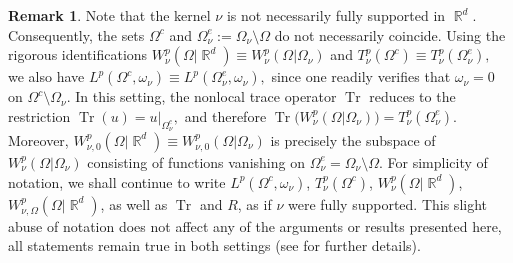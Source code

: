 \documentclass[12pt, reqno]{amsart}%
\theoremstyle{plain}  %
\theoremstyle{definition}  %
\newtheorem{remark}[theorem]{Remark}   %
\numberwithin{equation}{section}
\DeclareMathOperator{\R}{\mathbb{R}}
\newcommand{\WnuOmR}{W^{p}_{\nu}(\Omega|\R^d )}
\newcommand{\WnuOmO}{W^{p}_{\nu,\Omega}(\Omega|\R^d )}%
\newcommand{\WnuOmRO}{W_{\nu,0}^{p}(\Omega|\R^d )}%
\newcommand{\TnuOm}{T^{p}_{\nu} (\Omega^c)}
\begin{document}
\begin{remark}
Note that the kernel $\nu$ is not necessarily fully supported in $\R^d$. Consequently, the sets $\Omega^c$ and
$\Omega^e_\nu := \Omega_\nu \setminus \Omega$ do not necessarily coincide.
Using the rigorous identifications
$\WnuOmR \equiv W^p_{\nu}(\Omega | \Omega_\nu) $ and $\TnuOm \equiv T^p_{\nu}(\Omega^e_\nu),$
we also have $L^p(\Omega^c,\omega_\nu) \equiv L^p(\Omega^e_\nu,\omega_\nu),$
since one readily verifies that $\omega_\nu = 0$ on $\Omega^c \setminus \Omega_\nu$. In this setting, the nonlocal trace operator $\operatorname{Tr}$ reduces to the restriction $\operatorname{Tr}(u) = u\big|_{\Omega^e_\nu},$ and therefore $\operatorname{Tr}\big(W^p_\nu(\Omega | \Omega_\nu)\big) = T^p_{\nu}(\Omega^e_\nu).$
Moreover, $\WnuOmRO \equiv W^p_{\nu,0}(\Omega | \Omega_\nu)$
is precisely the subspace of $W^p_\nu(\Omega | \Omega_\nu)$ consisting of functions vanishing on
$\Omega^e_\nu = \Omega_\nu \setminus \Omega$.
For simplicity of notation, we shall continue to write $L^p(\Omega^c,\omega_\nu)$, $\TnuOm$, $\WnuOmR$, $\WnuOmO$, as well as $\operatorname{Tr}$ and $R$, as if $\nu$ were fully supported. This slight abuse of notation does not affect any of the arguments or results presented here, all statements remain true in both settings (see \cite{FoKa24,Fog25} for further details).


\end{remark}
\end{document}
